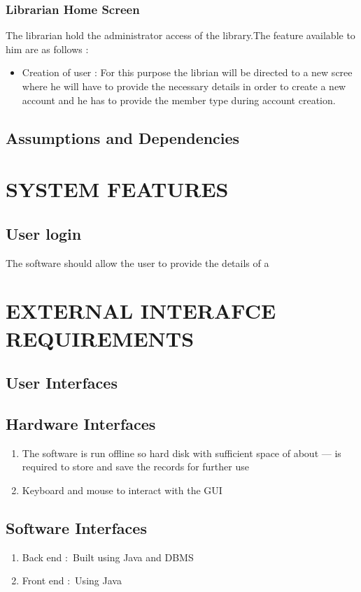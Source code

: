 \documentclass{article}
\begin{document}
\subsubsection*{Librarian Home Screen}
The librarian hold the administrator access of the library.The feature available to him are as follows :
\begin{itemize}
\item Creation of user :
For this purpose the librian will be directed to a new scree where he will have to provide the necessary details in order to create a new account and he has to provide the member type during account creation.
\end{itemize}

\subsection{Assumptions and Dependencies}


\section{SYSTEM FEATURES}
\subsection{User login}
The software should allow the user to provide the details of a 
\section{EXTERNAL INTERAFCE REQUIREMENTS}
\subsection{User Interfaces}
\subsection{Hardware Interfaces}
\begin{enumerate}
\item The software is run offline so hard disk with sufficient space of about --- is required to store and save the records for further use
\item Keyboard and mouse to interact with the GUI
\end{enumerate}
\subsection{Software Interfaces}
\begin{enumerate}
\item Back end  $:$ Built using Java and DBMS
\item Front end $:$ Using Java 
\end{enumerate}
\end{document}
